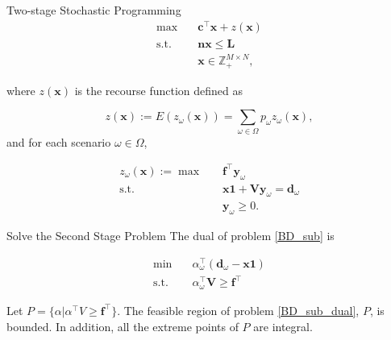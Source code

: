 \begin{frame}{Two-stage Stochastic Programming}
  \begin{equation}\label{BD_master}
    \begin{aligned}
  \max \quad & \mathbf{c}^{\intercal} \mathbf{x}+ z(\mathbf{x}) \\
  \text {s.t.} \quad & \mathbf{n} \mathbf{x} \leq \mathbf{L} \\
  & \mathbf{x} \in \mathbb{Z}_{+}^{M \times N},
  \end{aligned}
  \end{equation}

  where $z(\mathbf{x})$ is the recourse function defined as 

$$z(\mathbf{x}) := E(z_{\omega}(\mathbf{x})) = \sum_{\omega \in \Omega} p_{\omega} z_{\omega}(\mathbf{x}),$$ and for each scenario $\omega \in \Omega$, 

  \begin{equation}\label{BD_sub}
    \begin{aligned}
      z_{\omega}(\mathbf{x}) := \max \quad & \mathbf{f}^{\intercal} \mathbf{y}_{\omega} \\
      \text {s.t.} \quad & \mathbf{x} \mathbf{1} + \mathbf{V} \mathbf{y}_{\omega} = \mathbf{d}_{\omega} \\
       & \mathbf{y}_{\omega} \geq 0.
    \end{aligned}
    \end{equation}
\end{frame}

\begin{frame}{Solve the Second Stage Problem}
  The dual of problem \eqref{BD_sub} is

  \begin{equation}\label{BD_sub_dual}
    \begin{aligned}
      \min \quad & \alpha^{\intercal}_{\omega} (\mathbf{d}_{\omega}- \mathbf{x} \mathbf{1}) \\
      \text {s.t.} \quad & \alpha^{\intercal}_{\omega} \mathbf{V} \geq \mathbf{f}^{\intercal}
    \end{aligned}
    \end{equation}

    Let $P = \{\alpha|\alpha^{\intercal} V \geq \mathbf{f}^{\intercal}\}$. 
    The feasible region of problem \eqref{BD_sub_dual}, $P$, is bounded. In addition, all the extreme points of $P$ are integral.
\end{frame}

